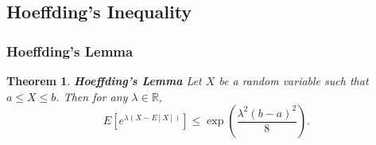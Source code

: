 \documentclass[11pt]{book} %
\newtheorem{theorem}{Theorem}[section]
\begin{document}
\subsection{Hoeffding's Inequality}

\subsubsection{Hoeffding's Lemma}

\begin{boxA}
    \begin{theorem}{\textbf{Hoeffding's Lemma}}
        Let \(X\) be a random variable such that \(a \leq X \leq b\). Then for any \(\lambda \in \mathbb{R}\),
        \begin{equation*}
            E\left[e^{\lambda (X - E[X])}\right] \leq \exp\left(\frac{\lambda^2 (b - a)^2}{8}\right).
        \end{equation*}
    \end{theorem}
\end{boxA}
\end{document}
